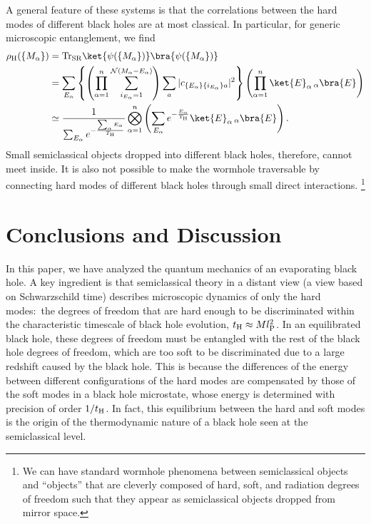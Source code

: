 \documentclass[12pt]{article}
\begin{document}
A general feature of these systems is that the correlations between 
the hard modes of different black holes are at most classical. 
In particular, for generic microscopic entanglement, we find
%
\begin{align}
  \rho_{\rm H}(\{ M_\alpha \}) 
  &= {\rm Tr}_{{\rm S} {\rm R}} 
    \ket{\psi(\{ M_\alpha \})} \bra{\psi(\{ M_\alpha \})} 
\nonumber\\
  &= \sum_{E_\alpha} \left\{ \left( \prod_{\alpha = 1}^n 
    \sum_{i_{E_\alpha} = 1}^{{\cal N}(M_\alpha-E_\alpha)} \right) 
    \sum_a |c_{\{E_\alpha\} \{i_{E_\alpha}\} a}|^2 \right\} 
    \left( \prod_{\alpha = 1}^n \ket{E}_\alpha\, 
      {}_\alpha\bra{E} \right) 
\nonumber\\
  &\simeq \frac{1}{\sum_{E_\alpha} 
    e^{-\frac{\sum_\alpha E_\alpha}{T_{\rm H}}}} 
    \bigotimes_{\alpha = 1}^n \left( \sum_{E_\alpha} 
      e^{-\frac{E_\alpha}{T_{\rm H}}} 
      \ket{E}_\alpha\, {}_\alpha\bra{E} \right).
\label{eq:rho_Hn}
\end{align}
%
Small semiclassical objects dropped into different black holes, 
therefore, cannot meet inside.  It is also not possible to make 
the wormhole traversable by connecting hard modes of different 
black holes through small direct interactions.%
\footnote{We can have standard wormhole phenomena between 
 semiclassical objects and ``objects'' that are cleverly composed 
 of hard, soft, and radiation degrees of freedom such that they 
 appear as semiclassical objects dropped from mirror space.}


\section{Conclusions and Discussion}
\label{sec:concl}

In this paper, we have analyzed the quantum mechanics of an 
evaporating black hole.  A key ingredient is that semiclassical 
theory in a distant view (a view based on Schwarzschild time) 
describes microscopic dynamics of only the hard modes:\ the degrees 
of freedom that are hard enough to be discriminated within the 
characteristic timescale of black hole evolution, $t_{\rm H} 
\approx Ml_{\rm P}^2$.  In an equilibrated black hole, these degrees 
of freedom must be entangled with the rest of the black hole degrees 
of freedom, which are too soft to be discriminated due to a large 
redshift caused by the black hole.  This is because the differences 
of the energy between different configurations of the hard modes 
are compensated by those of the soft modes in a black hole microstate, 
whose energy is determined with precision of order $1/t_{\rm H}$. 
In fact, this equilibrium between the hard and soft modes is the 
origin of the thermodynamic nature of a black hole seen at the 
semiclassical level.
\end{document}
